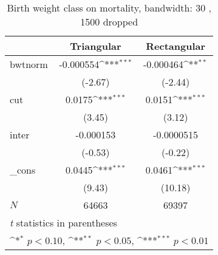 \begin{table}[htbp]\centering
\def\sym#1{\ifmmode^{#1}\else\(^{#1}\)\fi}
\caption{Birth weight class on mortality, bandwidth: 30 , 1500 dropped}
\begin{tabular}{l*{2}{c}}
\hline\hline
            &\multicolumn{1}{c}{Triangular}&\multicolumn{1}{c}{Rectangular}\\
\hline
bwtnorm     &   -0.000554\sym{***}&   -0.000464\sym{**} \\
            &     (-2.67)         &     (-2.44)         \\
[1em]
cut         &      0.0175\sym{***}&      0.0151\sym{***}\\
            &      (3.45)         &      (3.12)         \\
[1em]
inter       &   -0.000153         &  -0.0000515         \\
            &     (-0.53)         &     (-0.22)         \\
[1em]
\_cons      &      0.0445\sym{***}&      0.0461\sym{***}\\
            &      (9.43)         &     (10.18)         \\
\hline
\(N\)       &       64663         &       69397         \\
\hline\hline
\multicolumn{3}{l}{\footnotesize \textit{t} statistics in parentheses}\\
\multicolumn{3}{l}{\footnotesize \sym{*} \(p<0.10\), \sym{**} \(p<0.05\), \sym{***} \(p<0.01\)}\\
\end{tabular}
\end{table}
